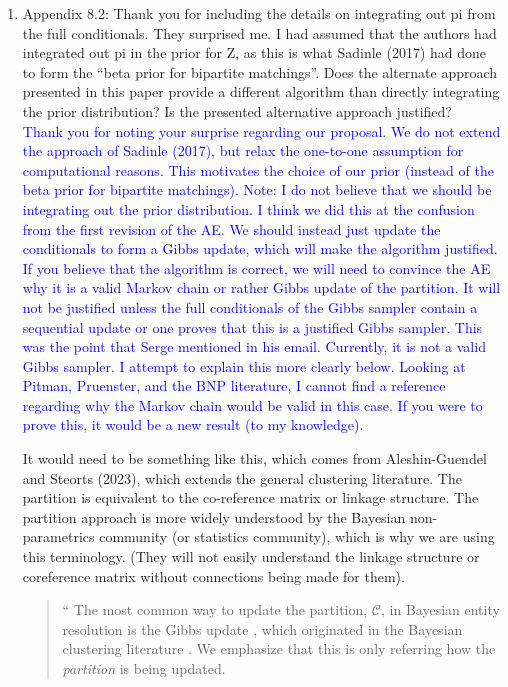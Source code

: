 \documentclass{article}
\newcommand{\C}{\mathcal{C}}
\begin{document}
\begin{enumerate}
    \item Appendix 8.2: Thank you for including the details on integrating out pi from the full
conditionals. They surprised me. I had assumed that the authors had integrated out pi in the
prior for Z, as this is what Sadinle (2017) had done to form the “beta prior for bipartite
matchings”. Does the alternate approach presented in this paper provide a different algorithm
than directly integrating the prior distribution? Is the presented alternative approach justified? \\
\textcolor{blue}{
Thank you for noting your surprise regarding our proposal. We do not extend the approach of Sadinle (2017), but relax the one-to-one assumption for computational reasons. This motivates the choice of our prior (instead of the beta prior for bipartite matchings). 
Note: I do not believe that we should be integrating out the prior distribution. I think we did this at the confusion from the first revision of the  AE. We should instead just update the conditionals to form a Gibbs update, which will make the algorithm justified. If you believe that the algorithm is correct, we will need to convince the AE why it is a valid Markov chain or rather Gibbs update of the partition. 
}
\textcolor{blue}{It will not be justified unless the full conditionals of the Gibbs sampler contain a sequential update or one proves that this is a justified Gibbs sampler. This was the point that Serge mentioned in his email. Currently, it is not a valid Gibbs sampler. I attempt to explain this more clearly below. Looking at Pitman, Pruenster, and the BNP literature, I cannot find a reference regarding why the Markov chain would be valid in this case. If you were to prove this, it would be a new result (to my knowledge).}

It would need to be something like this, which comes from Aleshin-Guendel and Steorts (2023), which extends the general clustering literature. The partition is equivalent to the co-reference matrix or linkage structure. The partition approach is more widely understood by the Bayesian non-parametrics community (or statistics community), which is why we are using this terminology. (They will not easily understand the linkage structure or coreference matrix without connections being made for them).

\begin{quote}
			`` The most common way to update the partition, $\C$, in Bayesian entity resolution is the Gibbs update \citep{Sadinle_2014, Steorts_2015, Sadinle_2017, Tancredi_2020, Marchant_2021, Aleshin-Guendel_2022, Marchant_2023}, which originated in the Bayesian clustering literature \citep[see e.g.][]{Neal_2000}.
			 We emphasize that this is only referring how the \textit{partition} is being updated. 
			 

\end{quote}
\end{enumerate}
\end{document}
